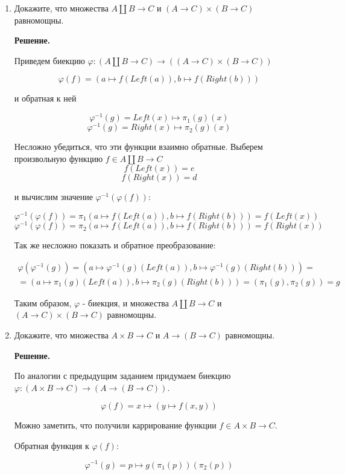 \begin{enumerate}
\item Докажите, что множества $A \amalg B \to C$ и $(A \to C) \times (B 
\to C)$ равномощны.

\textbf{Решение.} 

Приведем биекцию $\varphi : (A \amalg B \to C) \rightarrow ((A \to C) 
\times (B \to C))$

$$\varphi(f) = (a \mapsto f(Left(a)), b \mapsto f(Right(b)))$$

и обратная к ней

$$\varphi^{-1}(g) = Left(x) \mapsto \pi_1(g)(x)$$
$$\varphi^{-1}(g) = Right(x) \mapsto \pi_2(g)(x)$$

Несложно убедиться, что эти функции взаимно обратные.
Выберем произвольную функцию $f\in A \amalg B \to C$
$$f(Left(x)) = e$$
$$f(Right(x)) = d$$

и вычислим значение $\varphi^{-1}(\varphi(f))$:

$$\varphi^{-1}(\varphi(f)) = \pi_1(a \mapsto f(Left(a)), b \mapsto 
f(Right(b))) = f(Left(x))$$
$$\varphi^{-1}(\varphi(f)) = \pi_2(a \mapsto f(Left(a)), b \mapsto 
f(Right(b))) = f(Right(x))$$

Так же несложно показать и обратное преобразование:

\begin{equation*}
\begin{array} {lcl}
	\varphi(\varphi^{-1}(g)) = (a \mapsto \varphi^{-1}(g)(Left(a)), b 
	\mapsto \varphi^{-1}(g)(Right(b))) = \\
	= (a \mapsto \pi_1(g)(Left(a)), b \mapsto \pi_2(g)(Right(b))) = 
	(\pi_1(g), \pi_2(g)) = g
\end{array}
\end{equation*}

Таким образом, $\varphi$ - биекция, и множества $A \amalg B \to C$ и $(A 
\to C) \times (B \to C)$ равномощны.

\item Докажите, что множества $A \times B \to C$ и $A \to (B \to C)$ 
равномощны.

\textbf{Решение.} 

По аналогии с предыдущим заданием придумаем биекцию $\varphi : (A \times B 
\to C)\to (A \to (B \to C))$.

$$\varphi(f) = x \mapsto (y \mapsto f(x, y))$$

Можно заметить, что получили каррирование функции $f \in A \times B \to C$.

Обратная функция к $\varphi(f)$:

$$\varphi^{-1}(g) = p \mapsto g(\pi_1(p))(\pi_2(p))$$


\end{enumerate}
